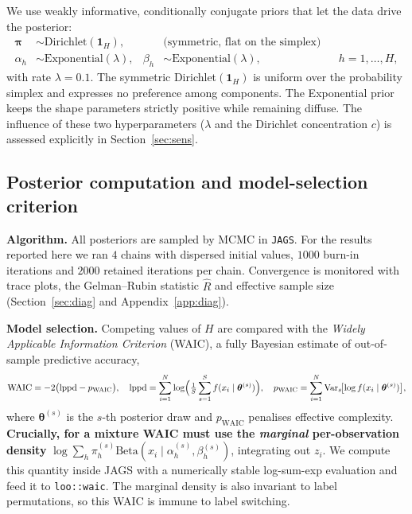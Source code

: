 \documentclass{article}
\newcommand{\nchains}{4}
\newcommand{\nburn}{1000}
\newcommand{\niter}{2000}
\begin{document}
We use weakly informative, conditionally conjugate priors that let the data
drive the posterior:
\begin{align}
\bm\pi &\sim \mathrm{Dirichlet}(\mathbf 1_H), &&\text{(symmetric, flat on the simplex)}\\
\alpha_h &\sim \mathrm{Exponential}(\lambda), &
\beta_h &\sim \mathrm{Exponential}(\lambda), && h=1,\dots,H,
\end{align}
with rate $\lambda=0.1$. The symmetric Dirichlet$(\mathbf 1_H)$ is uniform
over the probability simplex and expresses no preference among components.
The Exponential prior keeps the shape parameters strictly positive while
remaining diffuse. The influence of these two hyperparameters ($\lambda$ and the
Dirichlet concentration $c$) is assessed explicitly in
Section~\ref{sec:sens}.

\subsection{Posterior computation and model-selection criterion}
\label{sec:algo}

\textbf{Algorithm.} All posteriors are sampled by MCMC in \texttt{JAGS}. For the results reported here we ran $\nchains$ chains
with dispersed initial values, $\nburn$ burn-in iterations and $\niter$
retained iterations per chain. Convergence is monitored with trace plots,
the Gelman--Rubin statistic $\widehat R$ and effective sample size
(Section~\ref{sec:diag} and Appendix~\ref{app:diag}). 

\textbf{Model selection.} Competing values of $H$ are compared with the
\emph{Widely Applicable Information Criterion} (WAIC), a fully Bayesian
estimate of out-of-sample predictive accuracy,
\begin{equation}
\mathrm{WAIC}=-2\bigl(\mathrm{lppd}-p_{\mathrm{WAIC}}\bigr),\quad
\mathrm{lppd}=\sum_{i=1}^N\log\Bigl(\tfrac1S\sum_{s=1}^S f(x_i\mid\bm\theta^{(s)})\Bigr),\quad
p_{\mathrm{WAIC}}=\sum_{i=1}^N\mathrm{Var}_{s}\!\bigl[\log f(x_i\mid\bm\theta^{(s)})\bigr],
\end{equation}
where $\bm\theta^{(s)}$ is the $s$-th posterior draw and $p_{\mathrm{WAIC}}$
penalises effective complexity. \textbf{Crucially, for a mixture WAIC must
use the \emph{marginal} per-observation density}
$\log\sum_h \pi_h^{(s)}\mathrm{Beta}(x_i\mid\alpha_h^{(s)},\beta_h^{(s)})$,
integrating out $z_i$. We compute this quantity inside JAGS with a numerically
stable log-sum-exp evaluation and feed it to \texttt{loo::waic}. The marginal density is also invariant to label permutations, so this WAIC
is immune to label switching.
\end{document}
